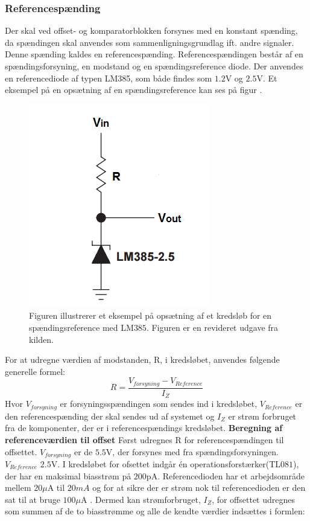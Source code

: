 \subsubsection{Referencespænding}\label{Spaendingsref}
Der skal ved offset- og komparatorblokken forsynes med en konstant spænding, da spændingen skal anvendes som sammenligningsgrundlag ift. andre signaler. Denne spænding kaldes en referencespænding. Referencespændingen består af en spændingsforsyning, en modstand og en spændingsreference diode. Der anvendes en referencediode af typen LM385, som både findes som $1.2$V og $2.5$V. Et eksempel på en opsætning af en spændingsreference kan ses på figur .

\begin{figure}[H]
	\centering
	\includegraphics[scale=1.0]{figures/cProblemloesning/ReferenceEksempel}
	\caption{Figuren illustrerer et eksempel på opsætning af et kredsløb for en spændingsreference med LM$385$. Figuren er en revideret udgave fra kilden. \cite{Instruments2005}}
	\label{fig:Spaendingsreference}
\end{figure}

For at udregne værdien af modstanden, R, i kredsløbet, anvendes følgende generelle formel:
\begin{equation}
R=\dfrac{V_{forsyning}-V_{Reference}}{I_{Z}}
\end{equation}
Hvor $V_{forsyning}$ er forsyningsspændingen som sendes ind i kredsløbet, $V_{Reference}$ er den referencespænding der skal sendes ud af systemet og $I_{Z}$ er strøm forbruget fra de komponenter, der er i referencespændings kredsløbet. 
\noindent \textbf{Beregning af referenceværdien til offset}
Først udregnes R for referencespændingen til offsettet. $V_{forsyning}$ er de $5.5$V, der forsynes med fra spændingsforsyningen. $V_{Reference}$ $2.5$V. I kredsløbet for ofsettet indgår én operationsforstærker(TL$081$), der har en maksimal biasstrøm på $200$pA\cite{Corporation1995}. Referencedioden har et arbejdsområde mellem $20\mu$A til $20mA$ og for at sikre der er strøm nok til referencedioden er den sat til at bruge $100\mu$A \cite{Instruments2005}. Dermed kan strømforbruget, $I_{Z}$, for offsettet udregnes som summen af de to biasstrømme og alle de kendte værdier indsættes i formlen:

